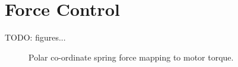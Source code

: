 \section{Force Control}

TODO: figures...

\begin{figure}
\centering
{}

\caption{Polar co-ordinate spring force mapping to motor torque.}
\label{fig:Polar co-ordinate spring force mapping to motor torque}
\end{figure}

